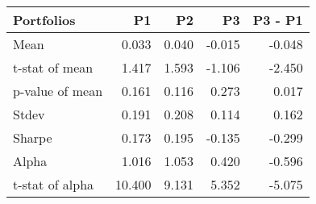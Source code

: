 \begin{tabular}{lrrrr}
\toprule
Portfolios & P1 & P2 & P3 & P3 - P1 \\
\midrule
Mean & 0.033 & 0.040 & -0.015 & -0.048 \\
t-stat of mean & 1.417 & 1.593 & -1.106 & -2.450 \\
p-value of mean & 0.161 & 0.116 & 0.273 & 0.017 \\
Stdev & 0.191 & 0.208 & 0.114 & 0.162 \\
Sharpe & 0.173 & 0.195 & -0.135 & -0.299 \\
Alpha & 1.016 & 1.053 & 0.420 & -0.596 \\
t-stat of alpha & 10.400 & 9.131 & 5.352 & -5.075 \\
\bottomrule
\end{tabular}
